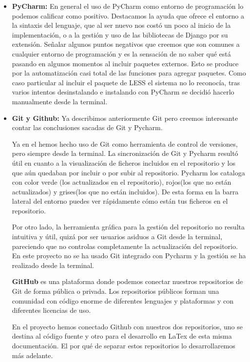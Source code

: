 \begin{itemize}
  \item \textbf{PyCharm:} 
  \bigskip
    En general el uso de PyCharm como entorno de programación lo podemos calificar como positivo. Destacamos la ayuda que ofrece el entorno a la sintaxis del lenguaje, que al ser nuevo nos costó un poco al inicio de la implementación, o a la gestión y uso de las bibliotecas de Django por su extensión.
    \bigskip
    Señalar algunos puntos negativos que creemos que son comunes a cualquier entorno de programación y es la sensación de no saber qué está pasando en algunos momentos al incluir paquetes externos. Esto se produce por la automatización casi total de las funciones para agregar paquetes. Como caso particular al incluir el paquete de LESS el sistema no lo reconocía, tras varios intentos desinstalando e instalando con PyCharm se decidió hacerlo manualmente desde la terminal.

  \item \textbf{Git y Github:}
  \bigskip
   Ya describimos anteriormente Git pero creemos interesante contar las conclusiones sacadas de Git y Pycharm.
  
  \bigskip
  Ya en el {\grado} hemos hecho uso de Git como herramienta de control de versiones, pero siempre desde la terminal. La sincronización de Git y Pycharm resultó útil en cuanto a la visualización de ficheros incluidos en el repositorio y los que aún quedaban  por incluir o por subir al repositorio. Pycharm los cataloga con color verde (los actualizados en el repositorio), rojos(los que no están actualizados) y grises(los que no están incluidos). De esta forma en la barra lateral del entorno puedes ver rápidamente cómo están tus ficheros en el repositorio.
  
  \bigskip
  Por otro lado, la herramienta gráfica para la gestión del repositorio no resulta intuitiva y útil, quizá por ser usuarios asiduos a Git desde la terminal, pareciendo que no controlas completamente la actualización del repositorio. En este proyecto no se ha usado Git integrado con Pycharm y la gestión se ha realizado desde la terminal.
  
  \bigskip
  \textbf{GitHub} es una plataforma donde podemos conectar nuestros repositorios de Git de forma pública o privada. Los repositorios públicos forman una comunidad con código enorme de diferentes lenguajes y plataformas y con diferentes licencias de uso. 
  
  \bigskip
  En el proyecto hemos conectado Github con nuestros dos repositorios, uno se destina al código fuente y otro para el desarrollo en LaTex de esta misma documentación. El por qué de separar estos repositorios lo desarrollaremos más adelante.


\end{itemize}
